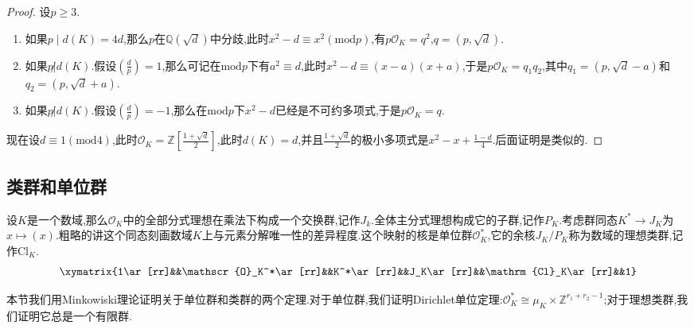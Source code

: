 \begin{enumerate}
\begin{proof}
    	设$p\ge3$.
    	\begin{enumerate}
    		\item 如果$p\mid d(K)=4d$,那么$p$在$\mathbb{Q}(\sqrt{d})$中分歧,此时$x^2-d\equiv x^2(\mathrm{mod}p)$,有$p\mathscr{O}_K=q^2$,$q=(p,\sqrt{d})$.
    		\item 如果$p\not| d(K)$.假设$\left(\frac{d}{p}\right)=1$,那么可记在$\mathrm{mod}p$下有$a^2\equiv d$,此时$x^2-d\equiv(x-a)(x+a)$,于是$p\mathscr{O}_K=q_1q_2$,其中$q_1=(p,\sqrt{d}-a)$和$q_2=(p,\sqrt{d}+a)$.
    		\item 如果$p\not| d(K)$.假设$\left(\frac{d}{p}\right)=-1$,那么在$\mathrm{mod}p$下$x^2-d$已经是不可约多项式,于是$p\mathscr{O}_K=q$.
    	\end{enumerate}
    	
    	现在设$d\equiv1(\mathrm{mod}4)$,此时$\mathscr{O}_K=\mathbb{Z}[\frac{1+\sqrt{d}}{2}]$,此时$d(K)=d$,并且$\frac{1+\sqrt{d}}{2}$的极小多项式是$x^2-x+\frac{1-d}{4}$.后面证明是类似的.
    \end{proof}
\end{enumerate}


\newpage
\subsection{类群和单位群}

设$K$是一个数域,那么$\mathscr{O}_K$中的全部分式理想在乘法下构成一个交换群,记作$J_k$.全体主分式理想构成它的子群,记作$P_K$.考虑群同态$K^*\to J_K$为$x\mapsto(x)$.粗略的讲这个同态刻画数域$K$上与元素分解唯一性的差异程度.这个映射的核是单位群$\mathscr{O}_K^*$,它的余核$J_K/P_K$称为数域的理想类群,记作$\mathrm{Cl}_K$.
$$\xymatrix{1\ar[rr]&&\mathscr{O}_K^*\ar[rr]&&K^*\ar[rr]&&J_K\ar[rr]&&\mathrm{Cl}_K\ar[rr]&&1}$$

本节我们用Minkowiski理论证明关于单位群和类群的两个定理.对于单位群,我们证明Dirichlet单位定理:$\mathscr{O}_K^*\cong\mu_K\times\mathbb{Z}^{r_1+r_2-1}$;对于理想类群,我们证明它总是一个有限群.

